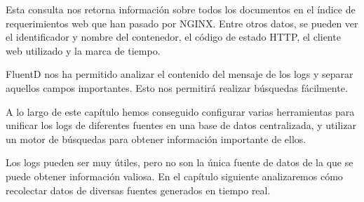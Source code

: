 Esta consulta nos retorna información sobre todos los documentos en el índice
de requerimientos web que han pasado por NGINX. Entre otros datos, se pueden
ver el identificador y nombre del contenedor, el código de estado HTTP, el
cliente web utilizado y la marca de tiempo.

FluentD nos ha permitido analizar el contenido del mensaje de los logs y
separar aquellos campos importantes. Esto nos permitirá realizar búsquedas
fácilmente.

A lo largo de este capítulo hemos conseguido configurar varias herramientas
para unificar los logs de diferentes fuentes en una base de datos centralizada,
y utilizar un motor de búsquedas para obtener información importante de ellos.

Los logs pueden ser muy útiles, pero no son la única fuente de datos de la que
se puede obtener información valiosa. En el capítulo siguiente analizaremos
cómo recolectar datos de diversas fuentes generados en tiempo real.


